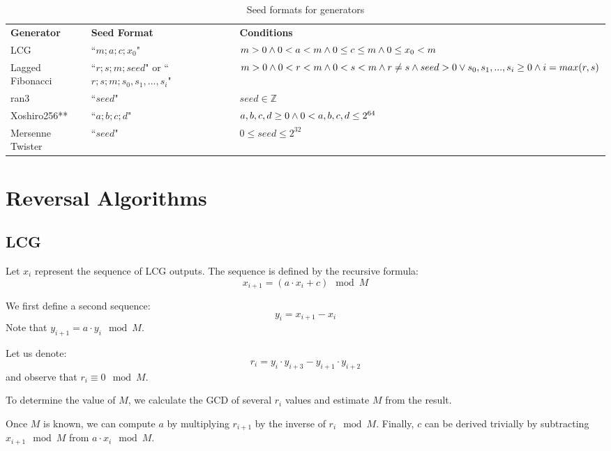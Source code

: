 \documentclass[12pt, a4paper]{report}
\begin{document}
\begin{table}
\begin{xltabular}{\textwidth}{| >{\raggedright\arraybackslash}X | >{\raggedright\arraybackslash}X | >{\raggedright\arraybackslash}X |}
	\caption{Seed formats for generators}
	\label{table:1}\\
	\hline
	\bf{Generator} & \bf{Seed Format} & \bf{Conditions} \\
	\hhline{|=|=|=|}
	LCG & 
	``$m;a;c;x_0$" & 
	$m > 0 \wedge\break 0 < a < m \wedge\break 0\leq c \leq m \wedge\break 0 \leq x_0 < m$\\
	\hline
	Lagged Fibonacci & 
	``$r;s;m;seed$" or \break ``$r;s;m;s_0, s_1, ..., s_i$" & 
	$m > 0 \wedge\break 0 < r < m \wedge\break 0 < s < m \wedge\break r \neq s \wedge\break\break seed > 0 \vee\break
	s_0, s_1, ..., s_i \geq 0 \wedge\break i = max(r, s)$\\
	\hline
	ran3 &
	``$seed$" & 
  $seed \in \mathbb{Z}$\\
	\hline
	Xoshiro256** &
	``$a;b;c;d$" & 
	$a,b,c,d \ge 0 \wedge\break 0 < a,b,c,d \leq 2^{64}$ \\
	\hline
	Mersenne Twister&
	``$seed$" &
	$0 \leq seed \leq 2^{32}$ \\
	\hline
\end{xltabular}
\end{table}

\chapter{Reversal Algorithms}
\section{LCG}
Let $x_i$ represent the sequence of LCG outputs. The sequence is defined by the recursive formula:
$$x_{i+1} = (a \cdot x_i + c) \mod M$$

We first define a second sequence:
$$y_{i} = x_{i+1} - x_{i}$$ 
Note that $y_{i+1} = a \cdot y_{i} \mod M$.

Let us denote:
$$r_i = y_{i} \cdot y_{i+3} - y_{i+1} \cdot y_{i+2}$$
and observe that $r_i \equiv 0 \mod M$.

To determine the value of $M$, we calculate the GCD of several $r_i$ values and estimate $M$ from the result.

Once $M$ is known, we can compute $a$ by multiplying $r_{i+1}$ by the inverse of $r_{i} \mod M$.
Finally, $c$ can be derived trivially by subtracting $x_{i+1} \mod M$ from $a
\cdot x_{i} \mod M$.
\end{document}
